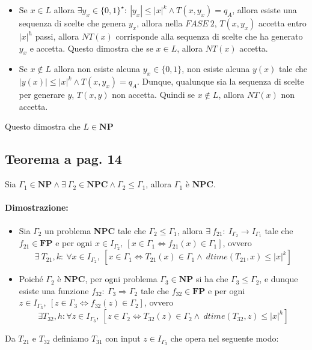 \begin{itemize}
{        \begin{itemize}
            \item {
                Se $x \in L$ allora $\exists y_{x} \in \{0, 1\}^{\star}:\ |y_{x}| \leq |x|^k \land T(x, y_{x}) = q_{A}$, allora 
                esiste  una sequenza di scelte che genera $y_{x}$, allora nella $FASE\ 2$, $T(x, y_{x})$ accetta entro $|x|^h$ passi, 
                allora $NT(x)$ corrisponde alla sequenza di scelte che ha generato $y_{x}$ e accetta. Questo dimostra che se $x \in L$, allora 
                $NT(x)$ accetta.
            }
            \item {
                Se $x \notin L$ allora non esiste alcuna $y_{x} \in \{0, 1\}$, non esiste alcuna $y(x)$ tale che $|y(x)| \leq |x|^k \land T(x, y_{x}) = q_{A}$.
                Dunque, qualunque sia la sequenza di scelte per generare  $y$, $T(x, y)$ non accetta. Quindi se $x \notin L$, allora $NT(x)$ non accetta. 
            }
        \end{itemize}
    }
\end{itemize}

Questo dimostra che $L \in \textbf{NP}$

\newpage
\subsection{Teorema a pag. 14}

Sia $\Gamma_{1} \in \textbf{NP} \land \exists\ \Gamma_{2} \in \textbf{NPC} \land \Gamma_{2} \leq \Gamma_{1}$, allora 
$\Gamma_{1}$ è \textbf{NPC}.

\paragraph*{Dimostrazione: }

\begin{itemize}
    \item []{
        Sia $\Gamma_{2}$ un problema \textbf{NPC} tale che $\Gamma_{2} \leq \Gamma_{1}$, allora $\exists\ f_{21}:\ I_{\Gamma_{2}} \rightarrow I_{\Gamma_{1}}$
        tale che $f_{21} \in \textbf{FP}$ e per ogni $x \in I_{\Gamma_{2}},\ [x \in \Gamma_{1} \Leftrightarrow f_{21}(x) \in \Gamma_{1}]$, 
        ovvero $$\exists\ T_{21}, k:\ \forall x \in I_{\Gamma_{2}},\ [x \in \Gamma_{1} \Leftrightarrow T_{21}(x) \in \Gamma_{1} \land\ dtime(T_{21}, x) \leq |x|^k]$$
    }
    \item []{
        Poiché $\Gamma_{2}$ è \textbf{NPC}, per ogni problema $\Gamma_{3} \in \textbf{NP}$ si ha che $\Gamma_{3} \leq \Gamma_{2}$, e dunque esiste una funzione $f_{32}:\ \Gamma_{3} \Rightarrow \Gamma_{2}$
        tale che $f_{32} \in \textbf{FP}$ e per ogni $z \in I_{\Gamma_{3}},\ [z \in \Gamma_{3} \Leftrightarrow f_{32}(z) \in \Gamma_{2}]$, ovvero 
        $$\exists T_{32}, h: \forall z \in I_{\Gamma_{3}},\ [z \in \Gamma_{2} \Leftrightarrow T_{32}(z) \in \Gamma_{2} \land\ dtime(T_{32}, z) \leq |x|^h]$$
    }
\end{itemize}
Da $T_{21}$ e $T_{32}$ definiamo $T_{31}$ con input $z \in I_{\Gamma_{3}}$ che opera nel seguente modo:


